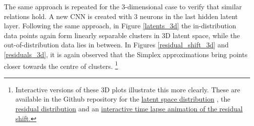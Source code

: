 \documentclass{article}
\begin{document}
The same approach is repeated for the 3-dimensional case to verify that similar relations hold. A new CNN is created with 3 neurons in the last hidden latent layer. Following the same approach, in Figure \ref{latents_3d} the in-distribution data points again form linearly separable clusters in 3D latent space, while the out-of-distribution data lies in between. In Figures \ref{residual_shift_3d} and \ref{residuals_3d}, it is again observed that the Simplex approximations bring points closer towards the centre of clusters.
\footnote{Interactive versions of these 3D plots illustrate this more clearly. These are available in the Github repository for the
\href{https://htmlpreview.github.io/?https://github.com/gjohl/xai/blob/master/xai/experiments/report_figures/latent_space/interactive_latent_space_scatter_3d.html}{latent space distribution}
, the
\href{https://htmlpreview.github.io/?https://github.com/gjohl/xai/blob/master/xai/experiments/report_figures/latent_space/interactive_residuals_3d.html}{residual distribution}
and an
\href{https://htmlpreview.github.io/?https://github.com/gjohl/xai/blob/master/xai/experiments/report_figures/latent_space/interactive_residual_shift_3d.html}{interactive time lapse animation of the residual shift.}
}




\end{document}
